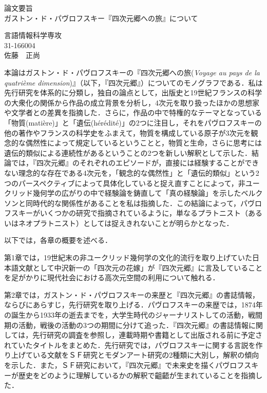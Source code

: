 \documentclass[uplatex,a4j,11pt]{jsarticle}
\title{\empty}
\author{\empty}
\date{\empty}
\begin{document}
\maketitle
\begin{center}
  {\Large 論文要旨}\\
  \vspace{30mm}
  {\large ガストン・ド・パヴロフスキー『四次元郷への旅』について}\\
\end{center}
\vspace{30mm}
\begin{flushright}
  言語情報科学専攻\\
  31-166004\\
  佐藤　正尚\\
\end{flushright}
\vspace{40mm}

本論はガストン・ド・パヴロフスキーの『四次元郷への旅(\emph{Voyage au pays de la quatrième dimension})』（以下，『四次元郷』）についてのモノグラフである．私は先行研究を体系的に分類し，独自の論点として，出版史と19世紀フランスの科学の大衆化の関係から作品の成立背景を分析し，4次元を取り扱ったほかの思想家や文学者との差異を指摘した．さらに，作品の中で特権的なテーマとなっている「物質(matière)」と「遺伝(hérédité)」の2つに注目し，それをパヴロフスキーの他の著作やフランスの科学史をふまえて，物質を構成している原子が3次元を観念的な偶然性によって規定しているということと，物質と生命，さらに思考には遺伝的類似による連続性があるということの2つを新しい解釈として示した．結論では，『四次元郷』のそれぞれのエピソードが，直接には経験することができない理念的な存在である4次元を，「観念的な偶然性」と「遺伝的類似」という2つのパースペクティブによって具体化していると捉え直すことによって，非ユークリッド幾何学の広がりの中で経験論を鋳直して「真の経験論」を示したベルクソンと同時代的な関係性があることを私は指摘した．この結論によって，パヴロフスキーがいくつかの研究で指摘されているように，単なるプラトニスト（あるいはネオプラトニスト）としては捉えきれないことが明らかとなった．

以下では，各章の概要を述べる．

第1章では，19世紀末の非ユークリッド幾何学の文化的流行を取り上げていた日本語文献として中沢新一の「四次元の花嫁」が『四次元郷』に言及していることを足がかりに現代社会における高次元空間の利用について触れる．

第2章では，ガストン・ド・パヴロフスキーの来歴と『四次元郷』の書誌情報，ならびにあらすじ，先行研究を取り上げる．パヴロフスキーの来歴では，1874年の誕生から1933年の逝去までを，大学生時代のジャーナリストしての活動，戦間期の活動，戦後の活動の3つの期間に分けて追った．『四次元郷』の書誌情報に関しては，先行研究の調査を参照し，連載時期や書籍として出版される前に予定されていたタイトルをまとめた．先行研究では，パヴロフスキーに関する言説を作り上げている文献をＳＦ研究とモダンアート研究の2種類に大別し，解釈の傾向を示した．また，ＳＦ研究において，『四次元郷』で未来史を描くパヴロフスキーが歴史をどのように理解しているかの解釈で齟齬が生まれていることを指摘した．
\end{document}
